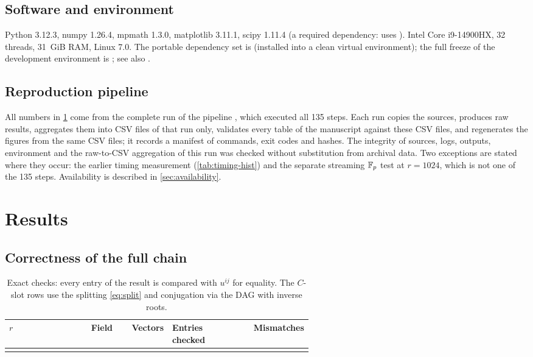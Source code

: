 \documentclass[11pt]{article}
\theoremstyle{plain}
\begin{document}
\subsection{Software and environment}\label{sec:env}
Python 3.12.3, numpy 1.26.4, mpmath 1.3.0, matplotlib 3.11.1, scipy 1.11.4 (a required dependency:  uses ). Intel Core i9-14900HX, 32 threads, 31~GiB RAM, Linux 7.0. The portable dependency set is  (installed into a clean virtual environment); the full freeze of the development environment is ; see also .

\subsection{Reproduction pipeline}\label{sec:pipeline}
All numbers in \cref{sec:results} come from the complete run  of the pipeline , which executed all 135 steps. Each run copies the sources, produces raw results, aggregates them into CSV files of that run only, validates every table of the manuscript against these CSV files, and regenerates the figures from the same CSV files; it records a manifest of commands, exit codes and hashes. The integrity of sources, logs, outputs, environment and the raw-to-CSV aggregation of this run was checked without substitution from archival data. Two exceptions are stated where they occur: the earlier timing measurement (\cref{tab:timing-hist}) and the separate streaming $\mathbb{F}_p$ test at $r=1024$, which is not one of the 135 steps. Availability is described in \cref{sec:availability}.

\section{Results}\label{sec:results}

\subsection{Correctness of the full chain}\label{sec:res-correct}

\begin{table}[tb]
\centering\small
\caption{Exact checks: every entry of the result is compared with $u^{ij}$ for equality. The $C$-slot rows use the splitting \eqref{eq:split} and conjugation via the DAG with inverse roots.}\label{tab:exact}
\begin{tabularx}{\linewidth}{@{}P{0.27\linewidth}LP{0.11\linewidth}P{0.2\linewidth}r@{}}
\toprule
$r$ & Field & Vectors & Entries checked & Mismatches \\
\midrule
{}
\bottomrule
\end{tabularx}
\end{table}
\end{document}
